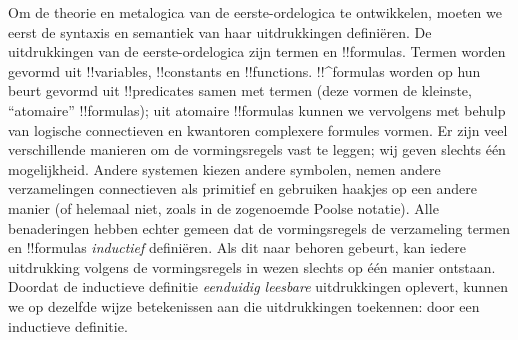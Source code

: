 \documentclass[../../../include/open-logic-section]{subfiles}
\begin{document}


Om de theorie en metalogica van de eerste-ordelogica te ontwikkelen,
moeten we eerst de syntaxis en semantiek van haar uitdrukkingen
definiëren. De uitdrukkingen van de eerste-ordelogica zijn termen en
!!{formula}s. Termen worden gevormd uit !!{variable}s, !!{constant}s en
!!{function}s. !!^{formula}s worden op hun beurt gevormd uit
!!{predicate}s samen met termen (deze vormen de kleinste, ``atomaire''
!!{formula}s); uit atomaire !!{formula}s kunnen we vervolgens met
behulp van logische connectieven en kwantoren complexere formules
vormen. Er zijn veel verschillende manieren om de vormingsregels vast
te leggen; wij geven slechts één mogelijkheid. Andere systemen kiezen
andere symbolen, nemen andere verzamelingen connectieven als primitief
en gebruiken haakjes op een andere manier (of helemaal niet, zoals in
de zogenoemde Poolse notatie). Alle benaderingen hebben echter gemeen
dat de vormingsregels de verzameling termen en !!{formula}s
\emph{inductief} definiëren. Als dit naar behoren gebeurt, kan iedere
uitdrukking volgens de vormingsregels in wezen slechts op één manier
ontstaan. Doordat de inductieve definitie \emph{eenduidig leesbare}
uitdrukkingen oplevert, kunnen we op dezelfde wijze betekenissen aan
die uitdrukkingen toekennen: door een inductieve definitie.
\end{document}
